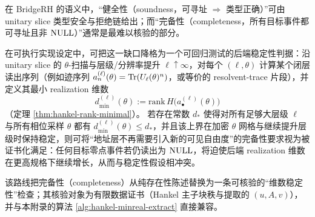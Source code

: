 \begin{remark}\label{rem:acc-rank-address-completeness}
在 BridgeRH 的语义中，“健全性（soundness，可寻址 \(\Rightarrow\) 类型正确）”可由 unitary slice 类型安全与拒绝链给出；而“完备性（completeness，所有目标事件都可寻址且非 \(\mathrm{NULL}\)）”通常是最难以核验的部分。
\par
在可执行实现设定中，可把这一缺口降格为一个可回归测试的后端稳定性判据：沿 unitary slice 的 \(\theta\)-扫描与层级/分辨率提升 \(\ell\uparrow\infty\)，对每个 \((\ell,\theta)\) 计算某个闭层读出序列（例如迹序列 \(a^{(\ell)}_n(\theta)=\mathrm{Tr}(U_{\ell}(\theta)^n)\)，或等价的 resolvent-trace 片段），并定义其最小 realization 维数
$$
d^{(\ell)}_{\min}(\theta):=\mathrm{rank}\,H\!\bigl(a^{(\ell)}_\bullet(\theta)\bigr)
$$
（定理 \ref{thm:hankel-rank-minimal}）。
若存在常数 \(d_\ast\) 使得对所有足够大层级 \(\ell\) 与所有相位采样 \(\theta\) 都有 \(d^{(\ell)}_{\min}(\theta)\le d_\ast\)，并且该上界在加密 \(\theta\) 网格与继续提升层级时保持稳定，则可将“地址层不再需要引入新的可见自由度”的完备性要求视为被证书化满足：任何目标零点事件若仍读出为 \(\mathrm{NULL}\)，将迫使后端 realization 维数在更高规格下继续增长，从而与稳定性假设相冲突。
\par
该路线把完备性（completeness）从纯存在性陈述替换为一条可核验的“维数稳定性”检查；其核验对象为有限数据证书（Hankel 主子块秩与提取的 \((u,A,v)\)），并与本附录的算法 \ref{alg:hankel-minreal-extract} 直接兼容。
\end{remark}

